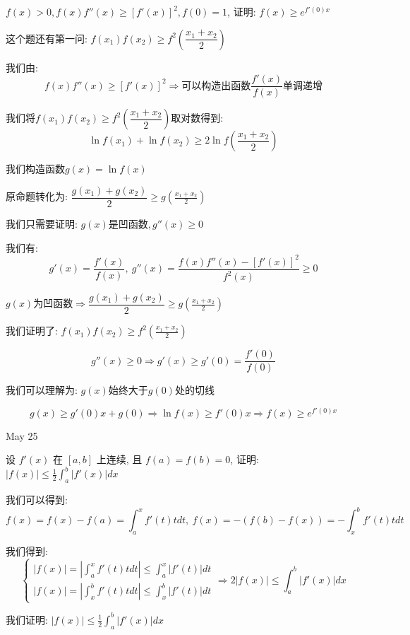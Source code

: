 \begin{example}[][Exam: 31.4.6]
	$f(x)>0, f(x)f''(x)\geq [f'(x)]^2, f(0)=1$, 证明: $f(x)\geq e^{f'(0)x}$
\end{example} 

\begin{solution}
	
	这个题还有第一问: $f(x_{1})f(x_{2})\geq f^2(\dfrac{x_{1}+x_{2}}{2})$
	
	我们由: $$f(x)f''(x)\geq [f'(x)]^2\Rightarrow \text{可以构造出函数}\frac{f'(x)}{f(x)}\text{单调递增}$$
	
	我们将$f(x_{1})f(x_{2})\geq f^2(\dfrac{x_{1}+x_{2}}{2})$取对数得到: 
	$$\ln f(x_{1})+\ln f(x_{2})\geq 2\ln f(\frac{x_{1}+x_{2}}{2})$$
	
	我们构造函数$g(x)=\ln f(x)$
	
	原命题转化为: $\dfrac{g(x_{1})+g(x_{2})}{2}\geq g(\frac{x_{1}+x_{2}}{2})$
	
	我们只需要证明: $g(x)\text{是凹函数},g''(x)\geq 0$
	
	我们有: $$g'(x)=\dfrac{f'(x)}{f(x)},\ g''(x)=\dfrac{f(x)f''(x)-[f'(x)]^2}{f^2(x)}\geq 0$$
	
	$g(x)\text{为凹函数}\Rightarrow \dfrac{g(x_{1})+g(x_{2})}{2}\geq g(\frac{x_{1}+x_{2}}{2})$
	
	我们证明了: $f(x_{1})f(x_{2})\geq f^2(\frac{x_{1}+x_{2}}{2})$
	
	$$g''(x)\geq 0\Rightarrow g'(x)\geq g'(0)=\dfrac{f'(0)}{f(0)}$$
	
	我们可以理解为: $g(x)\text{始终大于}g(0)\text{处的切线}$
	
	$$g(x)\geq g'(0)x+g(0)\Rightarrow \ln f(x)\geq f'(0)x\Rightarrow f(x)\geq e^{f'(0)x}$$
\end{solution}


\textcolor{purplea}{May 25}

\begin{example}[][Exam: 31.4.7]
	设 $f'(x)$ 在 $[a,b]$ 上连续, 且 $f(a)=f(b)=0$, 证明: $|f(x)|\leq \frac{1}{2}\int_{a}^{b}|f'(x)|dx$
\end{example}

\begin{solution}
	
	我们可以得到: $$f(x)=f(x)-f(a)=\int_{a}^{x}f'(t)tdt,\ f(x)=-(f(b)-f(x))=-\int_{x}^{b}f'(t)tdt$$
	
	我们得到: 
	$$\left\lbrace 
	\begin{array}{l}
		|f(x)|=|\int_{a}^{x}f'(t)tdt|\leq\int_{a}^{x}|f'(t)|dt\\
		|f(x)|=|\int_{x}^{b}f'(t)tdt|\leq\int_{x}^{b}|f'(t)|dt
	\end{array}
	\right. \Rightarrow 2|f(x)|\leq\int_{a}^{b}|f'(x)|dx$$
	
	我们证明: $|f(x)|\leq \frac{1}{2}\int_{a}^{b}|f'(x)|dx$
\end{solution}

